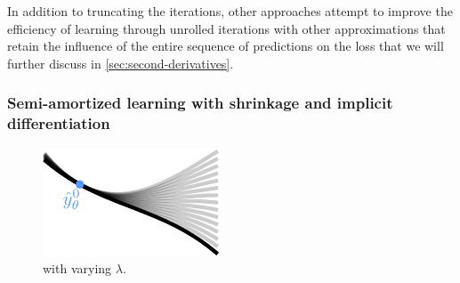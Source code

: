 \documentclass[twoside,11pt]{article}
\begin{document}
In addition to truncating the iterations, other approaches
attempt to improve the efficiency of learning through
unrolled iterations with other approximations
that retain the influence of the entire sequence
of predictions on the loss
\citep{finn2017model,nichol2018first,lorraine2020optimizing}
that we will further discuss in
\cref{sec:second-derivatives}.

\subsubsection{Semi-amortized learning with shrinkage and implicit differentiation}
\begin{figure}
\vspace{-5mm}
\includegraphics[width=\linewidth]{fig/imaml.pdf}
\caption{ with varying $\lambda$.}
\label{fig:imaml}
\vspace{-5mm}
\end{figure}
\end{document}
